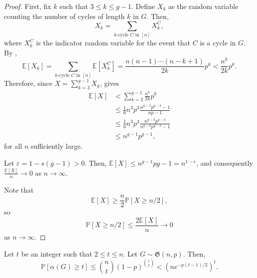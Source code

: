 \begin{proof}
    First, fix \(k\) such that \(3 \leq k \leq g-1\).
    Define \(X_k\) as the random variable counting the number of cycles of length \(k\) in \(G\).
    Then,
    \begin{equation}
        X_k = \sum_{\text{\(k\)-cycle \(C\) in \([n]\)}} X_k^C,
    \end{equation}
    where \(X_k^C\) is the indicator random variable for the event that \(C\) is a cycle in \(G\).
    By ,
    \begin{equation}
        \mathbb{E}[X_k]
        = \sum_{\text{\(k\)-cycle \(C\) in \([n]\)}} \mathbb{E}[X_k^C] 
        = \frac{n(n-1)\cdots(n-k+1)}{2k} p^k 
        < \frac{n^k}{2k} p^k.
    \end{equation}
    Therefore, since \(X = \sum_{k=3}^{g-1} X_k\),  gives
    \begin{align}
        \mathbb{E}[X]
        &< \sum_{k=3}^{g-1} \frac{n^k}{2k} p^k \\
        &\leq \frac{1}{6} n^3p^3 \frac{n^{g-3}p^{g-3} - 1}{np - 1} \\
        &\leq \frac{1}{6} n^3p^3 \frac{n^{g-3}p^{g-3}}{n^{g-3}p^{g-3} - 1} \\
        &\leq n^{g-1}p^{g-1},
    \end{align}
    for all \(n\) sufficiently large.

    Let \(\varepsilon = 1 - s(g-1) > 0\).
    Then, \(\mathbb{E}[X] \leq n^{g-1}p{g-1} = n^{1-\epsilon}\),
    and consequently \(\frac{\mathbb{E}[X]}{n} \to 0\) as \(n \to \infty\).

    Note  that
    \begin{equation}
        \mathbb{E}[X] \geq \frac{n}{2} \mathbb{P}[X \geq n/2],
    \end{equation}
    so
    \begin{equation}
        \mathbb{P}[X \geq n/2] \leq \frac{2\mathbb{E}[X]}{n} \to 0
    \end{equation}
    as \(n \to \infty\).
\end{proof}

\begin{lemma} \label{lem:bounding-independent-number}
    Let \(t\) be an integer such that \(2 \leq t \leq n\).
    Let \(G \sim \mathfrak{G}(n, p)\).
    Then,
    \begin{equation}
        \mathbb{P}[\alpha(G) \geq t]
        \leq \binom{n}{t} (1-p)^{\binom{t}{2}}
        < \left( n e^{-p(t-1)/2} \right)^t.
    \end{equation}
\end{lemma}

